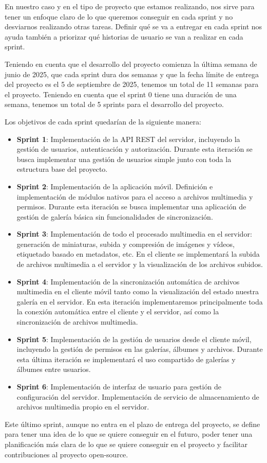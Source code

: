 En nuestro caso y en el tipo de proyecto que estamos realizando, nos sirve para tener un enfoque claro de lo que queremos conseguir en cada sprint y no desviarnos realizando otras tareas.
Definir qué se va a entregar en cada sprint nos ayuda también a priorizar qué historias de usuario se van a realizar en cada sprint.

Teniendo en cuenta que el desarrollo del proyecto comienza la última semana de junio de 2025, que cada sprint dura dos semanas y que la fecha límite de entrega del proyecto es el 5 de septiembre de 2025, tenemos un total de 11 semanas para el proyecto. Teniendo en cuenta que el sprint 0 tiene una duración de una semana, tenemos un total de 5 sprints para el desarrollo del proyecto.

Los objetivos de cada sprint quedarían de la siguiente manera:
\begin{itemize}
    \item \textbf{Sprint 1}: Implementación de la API REST del servidor, incluyendo la gestión de usuarios, autenticación y autorización. Durante esta iteración se busca implementar una gestión de usuarios simple junto con toda la estructura base del proyecto.
    \item \textbf{Sprint 2}: Implementación de la aplicación móvil. Definición e implementación de módulos nativos para el acceso a archivos multimedia y permisos. Durante esta iteración se busca implementar una aplicación de gestión de galería básica sin funcionalidades de sincronización.
    \item \textbf{Sprint 3}: Implementación de todo el procesado multimedia en el servidor: generación de miniaturas, subida y compresión de imágenes y vídeos, etiquetado basado en metadatos, etc. En el cliente se implementará la subida de archivos multimedia a el servidor y la visualización de los archivos subidos.
    \item \textbf{Sprint 4}: Implementación de la sincronización automática de archivos multimedia en el cliente móvil tanto como la visualización del estado nuestra galería en el servidor. En esta iteración implementaremos principalmente toda la conexión automática entre el cliente y el servidor, así como la sincronización de archivos multimedia.
    \item \textbf{Sprint 5}: Implementación de la gestión de usuarios desde el cliente móvil, incluyendo la gestión de permisos en las galerías, álbumes y archivos. Durante esta última iteración se implementará el uso compartido de galerías y álbumes entre usuarios.
    \item \textbf{Sprint 6}: Implementación de interfaz de usuario para gestión de configuración del servidor. Implementación de servicio de almacenamiento de archivos multimedia propio en el servidor.
\end{itemize}
Este último sprint, aunque no entra en el plazo de entrega del proyecto, se define para tener una idea de lo que se quiere conseguir en el futuro, poder tener una planificación más clara de lo que se quiere conseguir en el proyecto y facilitar contribuciones al proyecto open-source.

